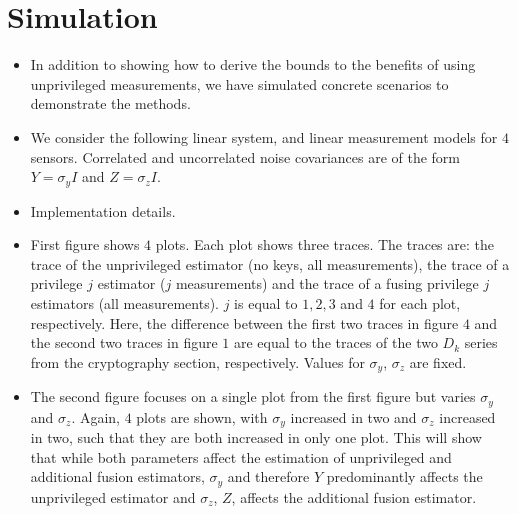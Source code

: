 \documentclass[conference]{IEEEtran}
\begin{document}
% 
%                                 
%                                 
%                                 
% 

\section{Simulation}\label{sec:sim}
\begin{itemize}
  \item In addition to showing how to derive the bounds to the benefits of using unprivileged measurements, we have simulated concrete scenarios to demonstrate the methods.
  \item We consider the following linear system, and linear measurement models for $4$ sensors. Correlated and uncorrelated noise covariances are of the form $Y=\sigma_y I$ and $Z = \sigma_z I$.
  \item Implementation details.
  \item First figure shows $4$ plots. Each plot shows three traces. The traces are: the trace of the unprivileged estimator (no keys, all measurements), the trace of a privilege $j$ estimator ($j$ measurements) and the trace of a fusing privilege $j$ estimators (all measurements). $j$ is equal to $1,2,3$ and $4$ for each plot, respectively. Here, the difference between the first two traces in figure $4$ and the second two traces in figure $1$ are equal to the traces of the two $D_k$ series from the cryptography section, respectively. Values for $\sigma_y$, $\sigma_z$ are fixed.
  \item The second figure focuses on a single plot from the first figure but varies $\sigma_y$ and $\sigma_z$. Again, $4$ plots are shown, with $\sigma_y$ increased in two and $\sigma_z$ increased in two, such that they are both increased in only one plot. This will show that while both parameters affect the estimation of unprivileged and additional fusion estimators, $\sigma_y$ and therefore $Y$ predominantly affects the unprivileged estimator and $\sigma_z$, $Z$, affects the additional fusion estimator.
\end{itemize}

% 
%                                               
%                                               
%                                               
% 
\end{document}
